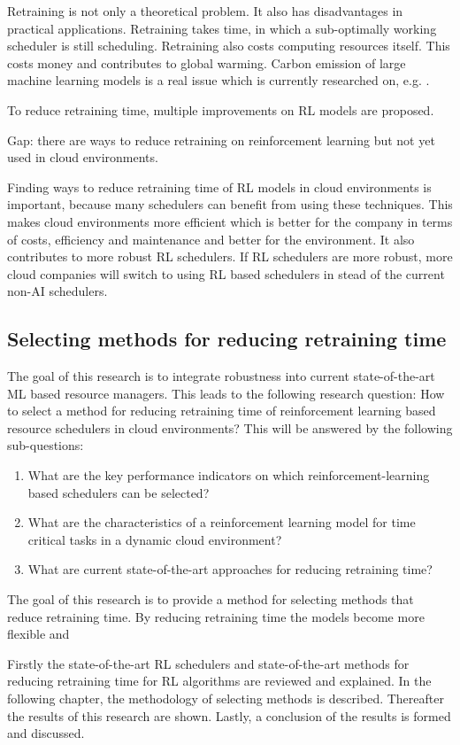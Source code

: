 Retraining is not only a theoretical problem. It also has disadvantages in
practical applications. Retraining takes time, in which a sub-optimally
working scheduler is still scheduling. Retraining also costs computing
resources itself. This costs money and contributes to global warming. Carbon
emission of large machine learning models is a real issue which is currently
researched on, e.g. .

To reduce retraining time, multiple improvements on RL models are proposed.


Gap: there are ways to reduce retraining on reinforcement learning but not yet
used in cloud environments.

Finding ways to reduce retraining time of RL models in cloud environments is
important, because many schedulers can benefit from using these techniques.
This makes cloud environments more efficient which is better for the company
in terms of costs, efficiency and maintenance and better for the environment.
It also contributes to more robust RL schedulers. If RL schedulers are more
robust, more cloud companies will switch to using RL based schedulers in stead
of the current non-AI schedulers.


\subsection{Selecting methods for reducing retraining time}

The goal of this research is to integrate robustness into current
state-of-the-art ML based resource managers. This leads to the following
research question: How to select a method for reducing retraining time of
reinforcement learning based resource schedulers in cloud environments? This
will be answered by the following sub-questions:

\begin{enumerate}
    \item What are the key performance indicators on which
        reinforcement-learning based schedulers can be selected?
    \item What are the characteristics of a reinforcement learning model for
        time critical tasks in a dynamic cloud environment?
    \item What are current state-of-the-art approaches for reducing retraining
        time?
\end{enumerate}


The goal of this research is to provide a method for selecting methods that
reduce retraining time. By reducing retraining time the models become more
flexible and


Firstly the state-of-the-art RL schedulers and state-of-the-art methods for
reducing retraining time for RL algorithms are reviewed and explained. In the
following chapter, the methodology of selecting methods is described.
Thereafter the results of this research are shown. Lastly, a conclusion of the
results is formed and discussed.

